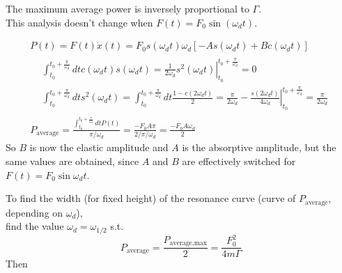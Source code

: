 The maximum average power is inversely proportional to $\Gamma$. \\

This analysis doesn't change when $F(t) = F_0 \sin{(\omega_d t)}$.

\[
\begin{gathered}
P(t) = F(t) \dot{x}(t) = F_0 s(\omega_d t) \omega_d [ -A s(\omega_d t) + Bc(\omega_d t) ] \\
\begin{aligned}
& \int_{t_0}^{t_0 + \frac{\pi}{\omega_d} } dt c(\omega_dt) s(\omega_d t) = \left. \frac{1}{2 \omega_d} s^2(\omega_d t) \right|_{t_0}^{t_0 + \frac{\pi}{\omega_d} } = 0 \\
& \int_{t_0}^{t_0 + \frac{\pi}{\omega_d} } dt s^2(\omega_dt) = \int_{t_0}^{t_0 + \frac{\pi}{\omega_d} } dt \frac{1 - c(2\omega_dt)}{2} = \frac{\pi}{2 \omega_d} - \left. \frac{s(2\omega_dt)}{ 4\omega_d} \right|_{t_0}^{t_0 + \frac{\pi}{\omega_d} } = \frac{\pi}{2\omega_d}
\end{aligned} \\
P_{\text{average}} = \frac{ \int_{t_0}^{t_0 + \frac{\pi}{\omega_d} } dt P(t) }{ \pi /\omega_d} = \frac{-F_0 A \pi}{2 / \pi/\omega_d} = \frac{-F_0 A \omega_d}{2}
\end{gathered}
\]
So $B$ is now the elastic amplitude and $A$ is the absorptive amplitude, but the same values are obtained, since $A$ and $B$ are effectively switched for $F(t) = F_0 \sin{\omega_d t}$.


To find the width (for fixed height) of the resonance curve (curve of $P_{\text{average}}$, depending on $\omega_d$), \\
find the value $\omega_d = \omega_{1/2}$ s.t. 
\[
P_{\text{average}} = \frac{P_{\text{average,max}}}{2} = \frac{F_0^2}{4m \Gamma}
\]
Then

